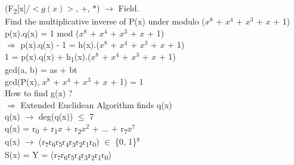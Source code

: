 \documentclass[11pt]{article}
\begin{document}
	(F\textsubscript{2}[x]/$<g(x)>$, +, $\ast$) $\rightarrow$ Field.\\
	Find the multiplicative inverse of P(x) under modulo ($x^8$ + $x^4$ + $x^3$ + $x$ + 1)\vspace{0.2cm}\\
	p(x).q(x) = 1 mod ($x^8$ + $x^4$ + $x^3$ + $x$ + 1)\\
	$\Rightarrow$ p(x).q(x) - 1 = h(x).($x^8$ + $x^4$ + $x^3$ + $x$ + 1)\\
	1 = p(x).q(x) + h\textsubscript{1}(x).($x^8$ + $x^4$ + $x^3$ + $x$ + 1)\vspace{0.2cm}\\
	gcd(a, b) = as + bt\\
	gcd(P(x), $x^8$ + $x^4$ + $x^3$ + $x$ + 1) = 1\vspace{0.2cm}\\
	How to find g(x) ?\\
	$\Rightarrow$ Extended Euclidean Algorithm finds q(x)\\
	q(x) $\rightarrow$ deg(q(x)) $\leq$ 7\\
	q(x) = r\textsubscript{0} + r\textsubscript{1}$x$ + r\textsubscript{2}$x^2$ + ... + r\textsubscript{7}$x^7$\\
	q(x) $\rightarrow$ (r\textsubscript{7}r\textsubscript{6}r\textsubscript{5}r\textsubscript{4}r\textsubscript{3}r\textsubscript{2}r\textsubscript{1}r\textsubscript{0}) $\in$ \{0, 1\}$^{8}$\\
	S(x) = Y = (r\textsubscript{7}r\textsubscript{6}r\textsubscript{5}r\textsubscript{4}r\textsubscript{3}r\textsubscript{2}r\textsubscript{1}r\textsubscript{0})\\
\end{document}
